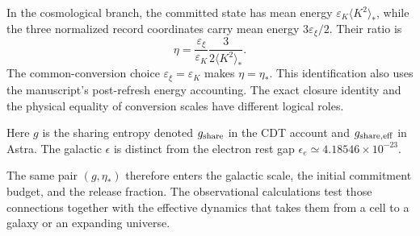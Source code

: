 In the cosmological branch, the committed state has mean energy
$\varepsilon_K\langle K^2\rangle_*$, while the three normalized record
coordinates carry mean energy $3\varepsilon_\xi/2$. Their ratio is
\begin{equation}
\eta=\frac{\varepsilon_\xi}{\varepsilon_K}
\frac{3}{2\langle K^2\rangle_*}.
\label{eq:etaenergy}
\end{equation}
The common-conversion choice $\varepsilon_\xi=\varepsilon_K$ makes
$\eta=\eta_*$. This identification also uses the manuscript's post-refresh
energy accounting. The exact closure identity and the physical equality
of conversion scales have different logical roles. 

Here $g$ is the sharing entropy denoted $g_{\rm share}$ in the CDT
account and $g_{\rm share,eff}$ in Astra. The galactic $\epsilon$ is
distinct from the electron rest gap $\epsilon_e\simeq4.18546\times10^{-23}$.

The same pair $(g,\eta_*)$ therefore enters the galactic scale, the initial
commitment budget, and the release fraction. The observational calculations
test those connections together with the effective dynamics that takes
them from a cell to a galaxy or an expanding universe.
